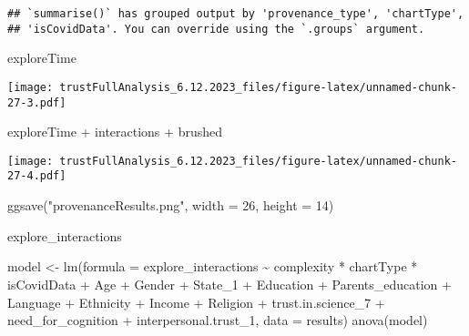 \documentclass[
]{article}
\newenvironment{Shaded}{\begin{snugshade}}{\end{snugshade}}
\newcommand{\AttributeTok}[1]{\textcolor[rgb]{0.77,0.63,0.00}{#1}}
\newcommand{\DecValTok}[1]{\textcolor[rgb]{0.00,0.00,0.81}{#1}}
\newcommand{\FunctionTok}[1]{\textcolor[rgb]{0.00,0.00,0.00}{#1}}
\newcommand{\NormalTok}[1]{#1}
\newcommand{\OtherTok}[1]{\textcolor[rgb]{0.56,0.35,0.01}{#1}}
\newcommand{\SpecialCharTok}[1]{\textcolor[rgb]{0.00,0.00,0.00}{#1}}
\newcommand{\StringTok}[1]{\textcolor[rgb]{0.31,0.60,0.02}{#1}}
\begin{document}
\begin{verbatim}
## `summarise()` has grouped output by 'provenance_type', 'chartType',
## 'isCovidData'. You can override using the `.groups` argument.
\end{verbatim}

\begin{Shaded}
\begin{Highlighting}[]
\NormalTok{exploreTime}
\end{Highlighting}
\end{Shaded}

\texttt{[image: trustFullAnalysis\_6.12.2023\_files/figure-latex/unnamed-chunk-27-3.pdf]}

\begin{Shaded}
\begin{Highlighting}[]
\NormalTok{exploreTime }\SpecialCharTok{+}\NormalTok{ interactions }\SpecialCharTok{+}\NormalTok{ brushed}
\end{Highlighting}
\end{Shaded}

\texttt{[image: trustFullAnalysis\_6.12.2023\_files/figure-latex/unnamed-chunk-27-4.pdf]}

\begin{Shaded}
\begin{Highlighting}[]
\FunctionTok{ggsave}\NormalTok{(}\StringTok{"provenanceResults.png"}\NormalTok{, }\AttributeTok{width =} \DecValTok{26}\NormalTok{, }\AttributeTok{height =} \DecValTok{14}\NormalTok{)}
\end{Highlighting}
\end{Shaded}

explore\_interactions

\begin{Shaded}
\begin{Highlighting}[]
\NormalTok{model }\OtherTok{\textless{}{-}} \FunctionTok{lm}\NormalTok{(}\AttributeTok{formula =}\NormalTok{ explore\_interactions }\SpecialCharTok{\textasciitilde{}}\NormalTok{ complexity }\SpecialCharTok{*}\NormalTok{ chartType }\SpecialCharTok{*}\NormalTok{ isCovidData }\SpecialCharTok{+}
\NormalTok{              Age }\SpecialCharTok{+}\NormalTok{ Gender }\SpecialCharTok{+}\NormalTok{ State\_1 }\SpecialCharTok{+}\NormalTok{ Education }\SpecialCharTok{+}\NormalTok{ Parents\_education }\SpecialCharTok{+}\NormalTok{ Language }\SpecialCharTok{+} 
\NormalTok{              Ethnicity }\SpecialCharTok{+}\NormalTok{ Income }\SpecialCharTok{+}\NormalTok{ Religion }\SpecialCharTok{+}\NormalTok{ trust.in.science\_7 }\SpecialCharTok{+} 
\NormalTok{              need\_for\_cognition }\SpecialCharTok{+}\NormalTok{ interpersonal.trust\_1,}
            \AttributeTok{data =}\NormalTok{ results)}
\FunctionTok{anova}\NormalTok{(model)}
\end{Highlighting}
\end{Shaded}
\end{document}
